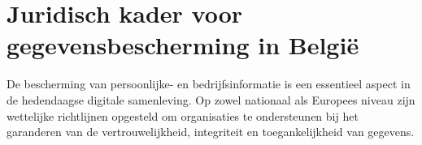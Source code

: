 







\section{Juridisch kader voor gegevensbescherming in België}%

De bescherming van persoonlijke- en bedrijfsinformatie is een essentieel aspect in de hedendaagse digitale samenleving. 
Op zowel nationaal als Europees niveau zijn wettelijke richtlijnen opgesteld om organisaties te ondersteunen bij het garanderen van de vertrouwelijkheid, 
integriteit en toegankelijkheid van gegevens.


